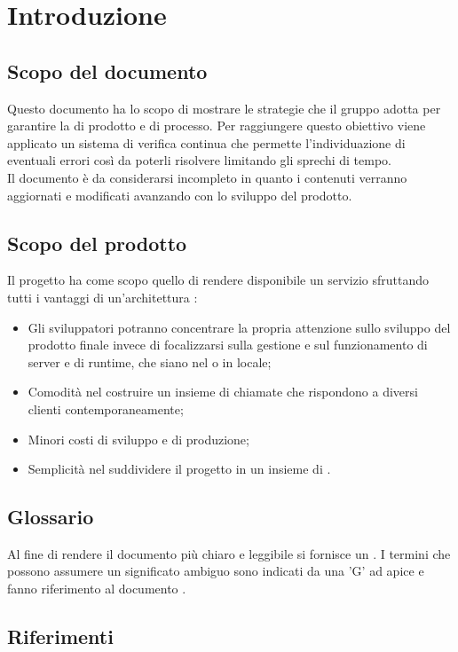 \section{Introduzione}
\label{introduzione}
\subsection{Scopo del documento}
Questo documento ha lo scopo di mostrare le strategie che il gruppo {\Gruppo} adotta per garantire la  di prodotto e di processo. Per raggiungere questo obiettivo viene applicato un sistema di verifica continua che permette l'individuazione di eventuali errori così da poterli risolvere limitando gli sprechi di tempo.\\Il documento è da considerarsi incompleto in quanto i contenuti verranno aggiornati e modificati avanzando con lo sviluppo del prodotto.
\subsection{Scopo del prodotto} 
Il progetto {\NomeProgetto} ha come scopo quello di rendere disponibile un servizio  sfruttando tutti i vantaggi di un'architettura :
\begin{itemize}
	\item Gli sviluppatori potranno concentrare la propria attenzione sullo sviluppo del prodotto finale invece di focalizzarsi sulla gestione e sul funzionamento di server e di runtime, che siano nel  o in locale;
	\item Comodità nel costruire un insieme di chiamate  che rispondono a diversi clienti contemporaneamente;
	\item Minori costi di sviluppo e di produzione;
	\item Semplicità nel suddividere il progetto in un insieme di .
\end{itemize}
\subsection{Glossario}
Al fine di rendere il documento più chiaro e leggibile si fornisce un \Glossario. I termini che possono assumere un significato ambiguo sono indicati da una 'G' ad apice e fanno riferimento al documento .
\subsection{Riferimenti}

